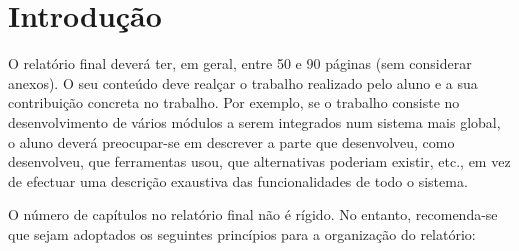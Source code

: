 \chapter{Introdução}

O relatório final deverá ter, em geral, entre 50 e 90 páginas (sem considerar anexos). O seu conteúdo deve realçar o trabalho realizado pelo aluno e a sua contribuição concreta no trabalho. Por exemplo, se o trabalho consiste no desenvolvimento de vários módulos a serem integrados num sistema mais global, o aluno deverá preocupar-se em descrever a parte que desenvolveu, como desenvolveu, que ferramentas usou, que alternativas poderiam existir, etc., em vez de efectuar uma descrição exaustiva das funcionalidades de todo o sistema.

O número de capítulos no relatório final não é rígido. No entanto, recomenda-se que sejam adoptados os seguintes princípios para a organização do relatório:

